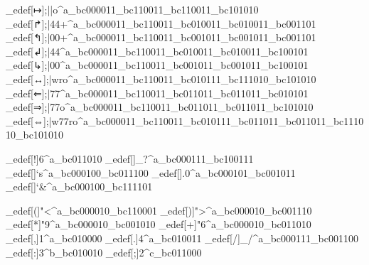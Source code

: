 \brl@char_edef[↦]{;||o^a}{\brl@char_bc000011\brl@char_bc110011\brl@char_bc110011\brl@char_bc101010}%
\brl@char_edef[↱]{;|44+^a}{\brl@char_bc000011\brl@char_bc110011\brl@char_bc010011\brl@char_bc010011\brl@char_bc001101}%
\brl@char_edef[↰]{;|00+^a}{\brl@char_bc000011\brl@char_bc110011\brl@char_bc001011\brl@char_bc001011\brl@char_bc001101}%
\brl@char_edef[↲]{;|44\brl@@percent^a}{\brl@char_bc000011\brl@char_bc110011\brl@char_bc010011\brl@char_bc010011\brl@char_bc100101}%
\brl@char_edef[↳]{;|00\brl@@percent^a}{\brl@char_bc000011\brl@char_bc110011\brl@char_bc001011\brl@char_bc001011\brl@char_bc100101}%
\brl@char_edef[↔]{;|wro^a}{\brl@char_bc000011\brl@char_bc110011\brl@char_bc010111\brl@char_bc111010\brl@char_bc101010}%
\brl@char_edef[⇐]{;|77\brl@@lbrace^a}{\brl@char_bc000011\brl@char_bc110011\brl@char_bc011011\brl@char_bc011011\brl@char_bc010101}%
\brl@char_edef[⇒]{;|77o^a}{\brl@char_bc000011\brl@char_bc110011\brl@char_bc011011\brl@char_bc011011\brl@char_bc101010}%
\brl@char_edef[⇔]{;|w77ro^a}{\brl@char_bc000011\brl@char_bc110011\brl@char_bc010111\brl@char_bc011011\brl@char_bc011011\brl@char_bc111010\brl@char_bc101010}%


\brl@char_edef[!]{6^a}{\brl@char_bc011010}%
\brl@char_edef[]{_?^a}{\brl@char_bc000111\brl@char_bc100111}%
\brl@char_edef[]{`s^a}{\brl@char_bc000100\brl@char_bc011100}%
\brl@char_edef[]{.0^a}{\brl@char_bc000101\brl@char_bc001011}%
\brl@char_edef[]{`&^a}{\brl@char_bc000100\brl@char_bc111101}%

\brl@char_edef[(]{"<^a}{\brl@char_bc000010\brl@char_bc110001}%
\brl@char_edef[)]{">^a}{\brl@char_bc000010\brl@char_bc001110}%
\brl@char_edef[*]{"9^a}{\brl@char_bc000010\brl@char_bc001010}%
\brl@char_edef[+]{"6^a}{\brl@char_bc000010\brl@char_bc011010}%
\brl@char_edef[,]{1^a}{\brl@char_bc010000}%
\brl@char_edef[.]{4^a}{\brl@char_bc010011}%
\brl@char_edef[/]{_/^a}{\brl@char_bc000111\brl@char_bc001100}%
\brl@char_edef[:]{3^b}{\brl@char_bc010010}%
\brl@char_edef[;]{2^c}{\brl@char_bc011000}%

